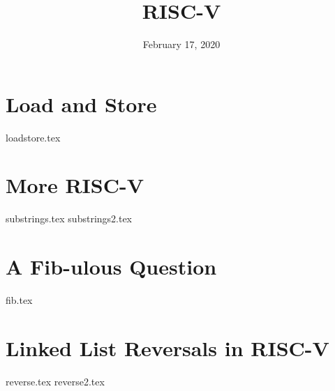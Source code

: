 \documentclass[11pt]{exam}
\title{RISC-V}
\date{February 17, 2020}
\begin{document}
\maketitle

\section{Load and Store}
\begin{questions}
{loadstore.tex}
\end{questions}
\newpage

\section{More RISC-V}
\begin{questions}
{substrings.tex}
{substrings2.tex}
\end{questions}
\newpage

\section{A Fib-ulous Question}
\begin{questions}
{fib.tex}
\end{questions}
\newpage

\section{Linked List Reversals in RISC-V}
\begin{questions}
{reverse.tex}
{reverse2.tex}
\end{questions}
\newpage
\end{document}
